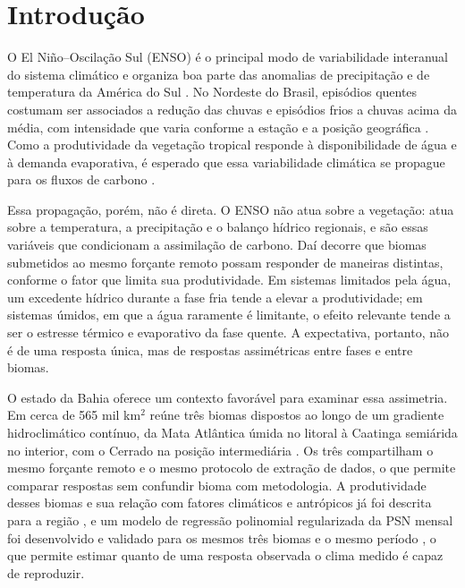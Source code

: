 \documentclass[a4paper,fleqn]{cas-sc}
\begin{document}
\maketitle

\section{Introdução}

O El Niño--Oscilação Sul (ENSO) é o principal modo de variabilidade interanual do sistema climático e organiza boa parte das anomalias de precipitação e de temperatura da América do Sul \citep{ropelewski1987, trenberth1997, grimm2003, grimm2009, cai2020}. No Nordeste do Brasil, episódios quentes costumam ser associados a redução das chuvas e episódios frios a chuvas acima da média, com intensidade que varia conforme a estação e a posição geográfica \citep{kayano2007, marengo2018}. Como a produtividade da vegetação tropical responde à disponibilidade de água e à demanda evaporativa, é esperado que essa variabilidade climática se propague para os fluxos de carbono \citep{zhao2010, nemani2003}.

Essa propagação, porém, não é direta. O ENSO não atua sobre a vegetação: atua sobre a temperatura, a precipitação e o balanço hídrico regionais, e são essas variáveis que condicionam a assimilação de carbono. Daí decorre que biomas submetidos ao mesmo forçante remoto possam responder de maneiras distintas, conforme o fator que limita sua produtividade. Em sistemas limitados pela água, um excedente hídrico durante a fase fria tende a elevar a produtividade; em sistemas úmidos, em que a água raramente é limitante, o efeito relevante tende a ser o estresse térmico e evaporativo da fase quente. A expectativa, portanto, não é de uma resposta única, mas de respostas assimétricas entre fases e entre biomas.

O estado da Bahia oferece um contexto favorável para examinar essa assimetria. Em cerca de 565 mil km$^2$ reúne três biomas dispostos ao longo de um gradiente hidroclimático contínuo, da Mata Atlântica úmida no litoral à Caatinga semiárida no interior, com o Cerrado na posição intermediária \citep{ibge2019, alvares2013}. Os três compartilham o mesmo forçante remoto e o mesmo protocolo de extração de dados, o que permite comparar respostas sem confundir bioma com metodologia. A produtividade desses biomas e sua relação com fatores climáticos e antrópicos já foi descrita para a região \citep{benfica2022, benfica2023}, e um modelo de regressão polinomial regularizada da PSN mensal foi desenvolvido e validado para os mesmos três biomas e o mesmo período \citep{oliveira2026}, o que permite estimar quanto de uma resposta observada o clima medido é capaz de reproduzir.
\end{document}
